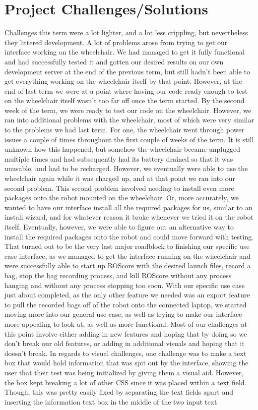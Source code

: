 \documentclass[onecolumn, draftclsnofoot,10pt, compsoc]{IEEEtran}
\begin{document}
\section{Project Challenges/Solutions}
Challenges this term were a lot lighter, and a lot less crippling, but nevertheless they littered development. A lot of problems arose from trying to get our interface working on the wheelchair. We had managed to get it fully functional and had successfully tested it and gotten our desired results on our own development server at the end of the previous term, but still hadn't been able to get everything working on the wheelchair itself by that point. However, at the end of last term we were at a point where having our code ready enough to test on the wheelchair itself wasn't too far off once the term started. By the second week of the term, we were ready to test our code on the wheelchair. However, we ran into additional problems with the wheelchair, most of which were very similar to the problems we had last term. For one, the wheelchair went through power issues a couple of times throughout the first couple of weeks of the term. It is still unknown how this happened, but somehow the wheelchair became unplugged multiple times and had subsequently had its battery drained so that it was unusable, and had to be recharged. However, we eventually were able to use the wheelchair again while it was charged up, and at that point we ran into our second problem. This second problem involved needing to install even more packages onto the robot mounted on the wheelchair. Or, more accurately, we wanted to have our interface install all the required packages for us, similar to an install wizard, and for whatever reason it broke whenever we tried it on the robot itself. Eventually, however, we were able to figure out an alternative way to install the required packages onto the robot and could move forward with testing. That turned out to be the very last major roadblock to finishing our specific use case interface, as we managed to get the interface running on the wheelchair and were successfully able to start up ROScore with the desired launch files, record a bag, stop the bag recording process, and kill ROScore without any process hanging and without any process stopping too soon. With our specific use case just about completed, as the only other feature we needed was an export feature to pull the recorded bags off of the robot onto the connected laptop, we started moving more into our general use case, as well as trying to make our interface more appealing to look at, as well as more functional. Most of our challenges at this point involve either adding in new features and hoping that by doing so we don't break our old features, or adding in additional visuals and hoping that it doesn't break. In regards to visual challenges, one challenge was to make a text box that would hold information that was spit out by the interface, showing the user that their test was being initialized by giving them a visual aid. However, the box kept breaking a lot of other CSS since it was placed within a text field. Though, this was pretty easily fixed by separating the text fields apart and inserting the information text box in the middle of the two input text 
\end{document}
